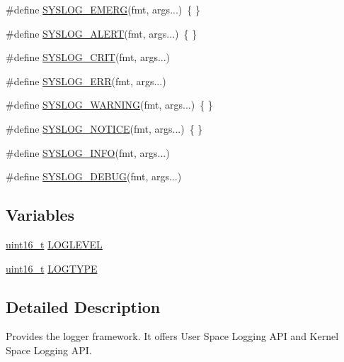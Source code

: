 \begin{DoxyCompactItemize}
\#define \hyperlink{group__SYSFRAMEWORK__LOG_ga78f938c353e4ad64de5bf4346aab5948}{S\-Y\-S\-L\-O\-G\-\_\-\-E\-M\-E\-R\-G}(fmt, args...)~\{ \}
\item 
\#define \hyperlink{group__SYSFRAMEWORK__LOG_ga2cb90a08bfc5f5721340b91e9a9d438b}{S\-Y\-S\-L\-O\-G\-\_\-\-A\-L\-E\-R\-T}(fmt, args...)~\{ \}
\item 
\#define \hyperlink{group__SYSFRAMEWORK__LOG_gaf70f5cecdbb327e462afc993f60603e6}{S\-Y\-S\-L\-O\-G\-\_\-\-C\-R\-I\-T}(fmt, args...)
\item 
\#define \hyperlink{group__SYSFRAMEWORK__LOG_gac9b68a403677aee2f663dd09f97773cf}{S\-Y\-S\-L\-O\-G\-\_\-\-E\-R\-R}(fmt, args...)
\item 
\#define \hyperlink{group__SYSFRAMEWORK__LOG_gadcfe639dbc1ac3f40090fada95624fb1}{S\-Y\-S\-L\-O\-G\-\_\-\-W\-A\-R\-N\-I\-N\-G}(fmt, args...)~\{ \}
\item 
\#define \hyperlink{group__SYSFRAMEWORK__LOG_ga2993334cae7892a7c110d8b2b88fc201}{S\-Y\-S\-L\-O\-G\-\_\-\-N\-O\-T\-I\-C\-E}(fmt, args...)~\{ \}
\item 
\#define \hyperlink{group__SYSFRAMEWORK__LOG_ga63dc622c071f44545ca9372d6b1b7958}{S\-Y\-S\-L\-O\-G\-\_\-\-I\-N\-F\-O}(fmt, args...)
\item 
\#define \hyperlink{group__SYSFRAMEWORK__LOG_gacb7620367e96b45dfaa648535904d5e1}{S\-Y\-S\-L\-O\-G\-\_\-\-D\-E\-B\-U\-G}(fmt, args...)
\end{DoxyCompactItemize}
\subsection*{Variables}
\begin{DoxyCompactItemize}
\item 
\hyperlink{commondefs_8h_adf4d876453337156dde61095e1f20223}{uint16\-\_\-t} \hyperlink{group__SYSFRAMEWORK__LOG_ga0b33a34b9be13e952b773f8004335033}{L\-O\-G\-L\-E\-V\-E\-L}
\item 
\hyperlink{commondefs_8h_adf4d876453337156dde61095e1f20223}{uint16\-\_\-t} \hyperlink{group__SYSFRAMEWORK__LOG_ga4fddbe43555720b1f547acde296315e6}{L\-O\-G\-T\-Y\-P\-E}
\end{DoxyCompactItemize}


\subsection{Detailed Description}
Provides the logger framework. It offers User Space Logging A\-P\-I and Kernel Space Logging A\-P\-I. 

